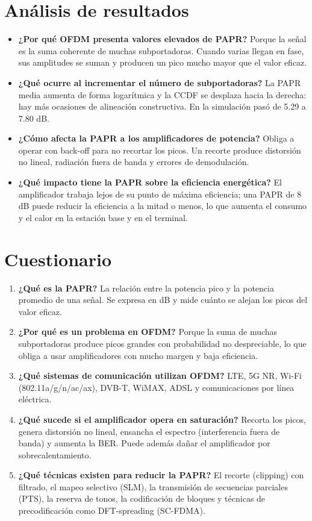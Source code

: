 \documentclass[11pt,a4paper]{article}
\begin{document}
\section{Análisis de resultados}

\begin{itemize}
  \item \textbf{¿Por qué OFDM presenta valores elevados de PAPR?} Porque la señal es la suma
        coherente de muchas subportadoras. Cuando varias llegan en fase, sus amplitudes se
        suman y producen un pico mucho mayor que el valor eficaz.
  \item \textbf{¿Qué ocurre al incrementar el número de subportadoras?} La PAPR media
        aumenta de forma logarítmica y la CCDF se desplaza hacia la derecha: hay más
        ocasiones de alineación constructiva. En la simulación pasó de 5.29 a 7.80 dB.
  \item \textbf{¿Cómo afecta la PAPR a los amplificadores de potencia?} Obliga a operar con
        back-off para no recortar los picos. Un recorte produce distorsión no lineal,
        radiación fuera de banda y errores de demodulación.
  \item \textbf{¿Qué impacto tiene la PAPR sobre la eficiencia energética?} El amplificador
        trabaja lejos de su punto de máxima eficiencia; una PAPR de 8 dB puede reducir la
        eficiencia a la mitad o menos, lo que aumenta el consumo y el calor en la estación
        base y en el terminal.
\end{itemize}

\section{Cuestionario}

\begin{enumerate}
  \item \textbf{¿Qué es la PAPR?} La relación entre la potencia pico y la potencia promedio
        de una señal. Se expresa en dB y mide cuánto se alejan los picos del valor eficaz.
  \item \textbf{¿Por qué es un problema en OFDM?} Porque la suma de muchas subportadoras
        produce picos grandes con probabilidad no despreciable, lo que obliga a usar
        amplificadores con mucho margen y baja eficiencia.
  \item \textbf{¿Qué sistemas de comunicación utilizan OFDM?} LTE, 5G NR, Wi-Fi
        (802.11a/g/n/ac/ax), DVB-T, WiMAX, ADSL y comunicaciones por línea eléctrica.
  \item \textbf{¿Qué sucede si el amplificador opera en saturación?} Recorta los picos,
        genera distorsión no lineal, ensancha el espectro (interferencia fuera de banda) y
        aumenta la BER. Puede además dañar el amplificador por sobrecalentamiento.
  \item \textbf{¿Qué técnicas existen para reducir la PAPR?} El recorte (clipping) con
        filtrado, el mapeo selectivo (SLM), la transmisión de secuencias parciales (PTS),
        la reserva de tonos, la codificación de bloques y técnicas de precodificación como
        DFT-spreading (SC-FDMA).
\end{enumerate}
\end{document}
